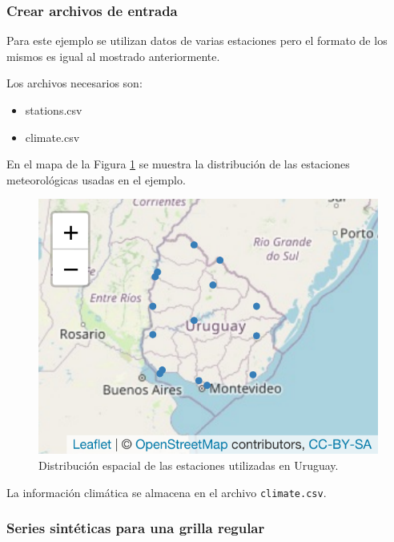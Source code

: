 \documentclass[
  12pt]{article}
\providecommand{\tightlist}{%
  \setlength{\itemsep}{0pt}\setlength{\parskip}{0pt}}
\begin{document}
\hypertarget{crear-archivos-de-entrada-1}{%
\subsubsection{Crear archivos de entrada}\label{crear-archivos-de-entrada-1}}

Para este ejemplo se utilizan datos de varias estaciones pero el formato de los mismos es igual al mostrado anteriormente.

Los archivos necesarios son:

\begin{itemize}
\tightlist
\item
  stations.csv
\item
  climate.csv
\end{itemize}

En el mapa de la Figura \ref{fig:mapa-estaciones-2} se muestra la distribución de las estaciones meteorológicas usadas en el ejemplo.

\begin{figure}[H]

{\centering \includegraphics{Manual_Generador_files/figure-latex/mapa-estaciones-2-1} 

}

\caption{Distribución espacial de las estaciones utilizadas en Uruguay.}\label{fig:mapa-estaciones-2}
\end{figure}

La información climática se almacena en el archivo \texttt{climate.csv}.

\hypertarget{series-sintuxe9ticas-para-una-grilla-regular}{%
\subsubsection{Series sintéticas para una grilla regular}\label{series-sintuxe9ticas-para-una-grilla-regular}}
\end{document}

